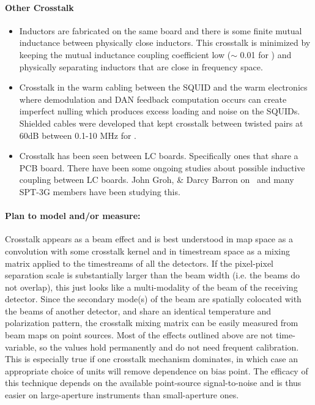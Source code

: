 \paragraph{Other Crosstalk}
\begin{itemize}
\item Inductors are fabricated on the same board and there is some finite mutual inductance between physically close inductors. This crosstalk is minimized by keeping the mutual inductance coupling coefficient low ($\sim$ 0.01 for \pb) and physically separating inductors that are close in frequency space. 
\item Crosstalk in the warm cabling between the SQUID and the warm electronics where demodulation and DAN feedback computation occurs can create imperfect nulling which produces excess loading and noise on the SQUIDs. Shielded cables were developed that kept crosstalk between twisted pairs at 60dB between 0.1-10 MHz for \pb.
\item Crosstalk has been seen between LC boards. Specifically ones that share a PCB board. There have been some ongoing studies about possible inductive coupling between LC boards. John Groh, \& Darcy Barron on \pb\ and many SPT-3G members have been studying this.
\end{itemize}

\paragraph{Plan to model and/or measure:}

Crosstalk appears as a beam effect and is best understood in map space as a convolution with some crosstalk kernel and in timestream space as a mixing matrix applied to the timestreams of all the detectors.
If the pixel-pixel separation scale is substantially larger than the beam width (i.e. the beams do not overlap), this just looks like a multi-modality of the beam of the receiving detector.
Since the secondary mode(s) of the beam are spatially colocated with the beams of another detector, and share an identical temperature and polarization pattern, the crosstalk mixing matrix can be easily measured from beam maps on point sources.
Most of the effects outlined above are not time-variable, so the values hold permanently and do not need frequent calibration.
This is especially true if one crosstalk mechanism dominates, in which case an appropriate choice of units will remove dependence on bias point.
The efficacy of this technique depends on the available point-source signal-to-noise and is thus easier on large-aperture instruments than small-aperture ones.

